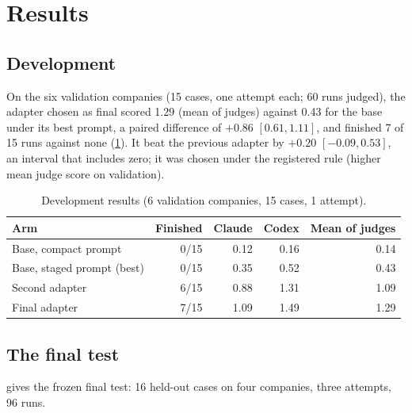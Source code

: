 \section{Results}\label{sec:results}

\subsection{Development}
On the six validation companies (15 cases, one attempt each; 60 runs judged), the adapter chosen as final scored 1.29
(mean of judges) against 0.43 for the base under its best prompt, a paired difference of $+0.86$ $[0.61, 1.11]$, and
finished 7 of 15 runs against none (\cref{tab:dev}). It beat the previous adapter by $+0.20$ $[-0.09, 0.53]$, an interval
that includes zero; it was chosen under the registered rule (higher mean judge score on validation).

\begin{table}[H]\centering\small
\caption{Development results (6 validation companies, 15 cases, 1 attempt).}\label{tab:dev}
\begin{tabular}{@{}lrrrr@{}}
\toprule
Arm & Finished & Claude & Codex & Mean of judges\\
\midrule
Base, compact prompt & 0/15 & 0.12 & 0.16 & 0.14\\
Base, staged prompt (best) & 0/15 & 0.35 & 0.52 & 0.43\\
Second adapter & 6/15 & 0.88 & 1.31 & 1.09\\
Final adapter & 7/15 & 1.09 & 1.49 & 1.29\\
\bottomrule
\end{tabular}
\end{table}

\subsection{The final test}
 gives the frozen final test: 16 held-out cases on four companies, three attempts, 96 runs.


